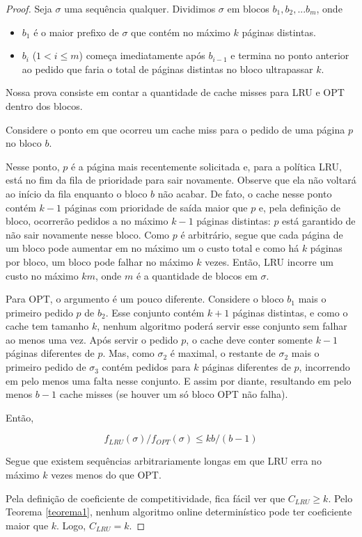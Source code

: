 \documentclass[a4paper,oneside,reqno,12pt]{amsart}
\begin{document}
\begin{proof}
Seja $\sigma$ uma sequência qualquer. Dividimos $\sigma$ em blocos $b_1, b_2, ... b_{m}$, onde 
\begin{itemize}
    \item $b_1$ é o maior prefixo de $\sigma$ que contém no máximo $k$ páginas distintas.
    \item $b_i$ ($1 < i \le m$) começa imediatamente após $b_{i-1}$ e termina no ponto anterior ao pedido que faria o total de páginas distintas no bloco ultrapassar $k$. 
\end{itemize}

Nossa prova consiste em contar a quantidade de cache misses para LRU e OPT dentro dos blocos.

Considere o ponto em que ocorreu um cache miss para o pedido de uma página $p$ no bloco $b$.

Nesse ponto, $p$ é a página mais recentemente solicitada e, para a política LRU, está no fim da fila de prioridade para sair novamente. Observe que ela não voltará ao início da fila enquanto o bloco $b$ não acabar. De fato, o cache nesse ponto contém $k-1$ páginas com prioridade de saída maior que $p$ e, pela definição de bloco, ocorrerão pedidos a no máximo $k-1$ páginas distintas: $p$ está garantido de não sair novamente nesse bloco. Como $p$ é arbitrário, segue que cada página de um bloco pode aumentar em no máximo um o custo total e como há $k$ páginas por bloco, um bloco pode falhar no máximo $k$ vezes. Então, LRU incorre um custo no máximo $km$, onde $m$ é a quantidade de blocos em $\sigma$.

Para OPT, o argumento é um pouco diferente. Considere o bloco $b_1$ mais o primeiro pedido $p$ de $b_2$. Esse conjunto contém $k+1$ páginas distintas, e como o cache tem tamanho $k$, nenhum algoritmo poderá servir esse conjunto sem falhar ao menos uma vez. Após servir o pedido $p$, o cache deve conter somente $k-1$ páginas diferentes de $p$. Mas, como $\sigma_2$ é maximal, o restante de $\sigma_2$ mais o primeiro pedido de $\sigma_3$ contém pedidos para $k$ páginas diferentes de $p$, incorrendo em pelo menos uma falta nesse conjunto. E assim por diante, resultando em pelo menos $b - 1$ cache misses (se houver um só bloco OPT não falha).

Então, 

\[f_{LRU}(\sigma)/f_{OPT}(\sigma) \le kb/(b-1)\]

Segue que existem sequências arbitrariamente longas em que LRU erra no máximo $k$ vezes menos do que OPT.

Pela definição de coeficiente de competitividade, fica fácil ver que $C_{LRU} \ge k$. Pelo Teorema \ref{teorema1}, nenhum algoritmo online determinístico pode ter coeficiente maior que $k$. Logo, $C_{LRU} = k$.
\end{proof}
\end{document}
